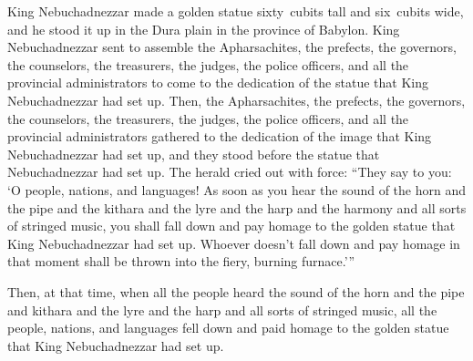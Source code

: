 
\begin{inparaenum}
     King Nebuchadnezzar made a golden statue sixty~cubits tall and six~cubits wide, and he stood it up in the Dura plain in the province of Babylon.%
     King Nebuchadnezzar sent to assemble the Apharsachites, the prefects, the governors, the counselors, the treasurers, the judges, the police officers, and all the provincial administrators to come to the dedication of the statue that King Nebuchadnezzar had set up.%
     Then, the Apharsachites, the prefects, the governors, the counselors, the treasurers, the judges, the police officers, and all the provincial administrators gathered to the dedication of the image that King Nebuchadnezzar had set up, and they stood before the statue that Nebuchadnezzar had set up.%
     The herald cried out with force: ``They say to you: `O people, nations, and languages!%
     As soon as you hear the sound of the horn and the pipe and the kithara and the lyre and the harp and the harmony and all sorts of stringed music, you shall fall down and pay homage to the golden statue that King Nebuchadnezzar had set up.%
     Whoever doesn't fall down and pay homage in that moment shall be thrown into the fiery, burning furnace.'\thinspace''%
    
     Then, at that time, when all the people heard the sound of the horn and the pipe and kithara and the lyre and the harp and all sorts of stringed music, all the people, nations, and languages fell down and paid homage to the golden statue that King Nebuchadnezzar had set up.%
    

\end{inparaenum}
